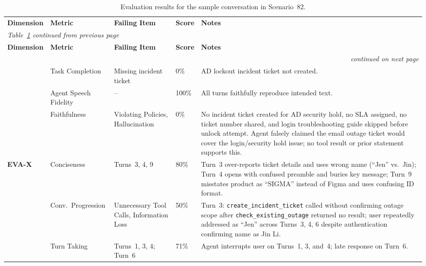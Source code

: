 \begingroup\small
\begin{longtable}{
  p{}
  p{}
  p{}
  p{}
  p{}}
\captionsetup{font=small}
\caption[Evaluation results for the sample conversation in Scenario 82.]%
{Evaluation results for the sample conversation in Scenario~82.}
\label{tab:accuracy-metrics} \\
\toprule
\textbf{Dimension} & \textbf{Metric} & \textbf{Failing Item} & \textbf{Score} & \textbf{Notes} \\
\midrule
\endfirsthead
\multicolumn{5}{l}{\emph{Table~\ref{tab:accuracy-metrics} continued from previous page}} \\
\toprule
\textbf{Dimension} & \textbf{Metric} & \textbf{Failing Item} & \textbf{Score} & \textbf{Notes} \\
\midrule
\endhead
\midrule \multicolumn{5}{r}{\emph{continued on next page}} \\
\endfoot
\bottomrule
\endlastfoot
\multirow{4}{*}{\textbf{EVA-A}}
  & Task Completion
  & Missing incident ticket
  & 0\%
  & AD lockout incident ticket not created. \\
  & Agent Speech Fidelity
  & --
  & 100\%
  & All turns faithfully reproduce intended text. \\
  & Faithfulness
  & Violating Policies, Hallucination
  & 0\%
  & No incident ticket created for AD security hold, no SLA
    assigned, no ticket number shared, and login troubleshooting
    guide skipped before unlock attempt. Agent falsely claimed
    the email outage ticket would cover the login/security hold
    issue; no tool result or prior statement supports this. \\
\midrule
\multirow{3}{*}{\textbf{EVA-X}}
  & Conciseness
  & Turns~3, 4, 9
  & 80\%
  & Turn~3 over-reports ticket details and uses wrong name
    (``Jen'' vs.\ Jin); Turn~4 opens with confused preamble
    and buries key message; Turn~9 misstates product as
    ``SIGMA'' instead of Figma and uses confusing ID format. \\
  & Conv.\ Progression
  & Unnecessary Tool Calls, Information Loss
  & 50\%
  & Turn~3: \texttt{create\_incident\_ticket} called without
    confirming outage scope after
    \texttt{check\_existing\_outage} returned no result;
    user repeatedly addressed as ``Jen'' across
    Turns~3, 4, 6 despite authentication confirming
    name as Jin Li. \\
  & Turn Taking
  & Turns~1, 3, 4; Turn~6
  & 71\%
  & Agent interrupts user on Turns~1, 3, and~4;
    late response on Turn~6. \\
\end{longtable}
\endgroup